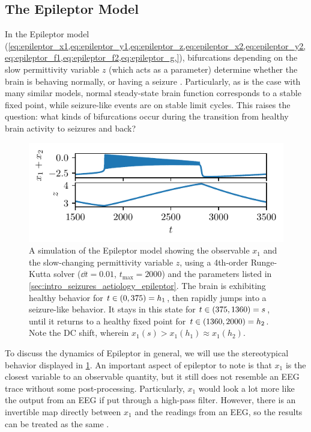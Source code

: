 \subsection{The Epileptor Model}
\label{sec:lit_review_bifurcation_epileptor}
In the Epileptor model (\cref{eq:epileptor_x1,eq:epileptor_y1,eq:epileptor_z,eq:epileptor_x2,eq:epileptor_y2,eq:epileptor_f1,eq:epileptor_f2,eq:epileptor_g,}), bifurcations depending on the slow permittivity variable $z$ (which acts as a parameter) determine whether the brain is behaving normally, or having a seizure \cite{Jirsa2014}.
Particularly, as is the case with many similar models, normal steady-state brain function corresponds to a stable fixed point, while seizure-like events are on stable limit cycles.
This raises the question: what kinds of bifurcations occur during the transition from healthy brain activity to seizures and back?
\begin{figure}[ht]
  \centering
  \includegraphics{figure/epileptor}
  \caption[Epileptor simulation]{A simulation of the Epileptor model showing the observable $x_{1}$ and the slow-changing permittivity variable $z$, using a 4th-order Runge-Kutta solver ($\dd{t} = 0.01$, $t_{\text{max}} = 2000$) and the parameters listed in \cref{sec:intro_seizures_aetiology_epileptor}.
    The brain is exhibiting healthy behavior for $t \in \pqty{0, 375} = h_{1}$, then rapidly jumps into a seizure-like behavior.
    It stays in this state for $t \in \pqty{375, 1360} = s$, until it returns to a healthy fixed point for $t \in \pqty{1360, 2000} = h_{2}$.
    Note the DC shift, wherein $x_{1}(s) > x_{1}(h_{1}) \approx x_{1}(h_{2})$.
  }
  \label{fig:epileptor}
\end{figure}

To discuss the dynamics of Epileptor in general, we will use the stereotypical behavior displayed in \cref{fig:epileptor}.
An important aspect of epileptor to note is that $x_{1}$ is the closest variable to an observable quantity, but it still does not resemble an EEG trace without some post-processing.
Particularly, $x_{1}$ would look a lot more like the output from an EEG if put through a high-pass filter.
However, there is an invertible map directly between $x_{1}$ and the readings from an EEG, so the results can be treated as the same \cite{Jirsa2014}.

